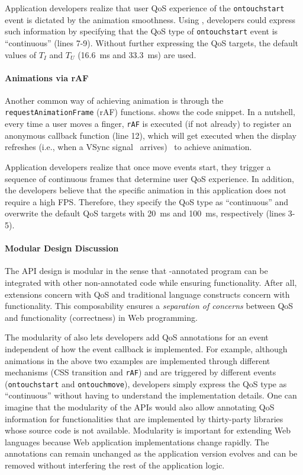 Application developers realize that user QoS experience of the \texttt{ontouchstart} event is dictated by the animation smoothness. Using \greenweb, developers could express such information by specifying that the QoS type of \texttt{ontouchstart} event is ``continuous'' (lines 7-9). Without further expressing the QoS targets, the default values of $T_I$ and $T_U$ (16.6~ms and 33.3~ms) are used.

\paragraph{Animations via rAF} Another common way of achieving animation is through the \texttt{requestAnimationFrame} (rAF) functions.  shows the code snippet. In a nutshell, every time a user moves a finger, \texttt{rAF} is executed (if not already) to register an anonymous callback function (line 12), which will get executed when the display refreshes (i.e., when a VSync signal~\cite{vsync} arrives)~\cite{jankbusting} to achieve animation.

Application developers realize that once move events start, they trigger a sequence of continuous frames that determine user QoS experience. In addition, the developers believe that the specific animation in this application does not require a high FPS. Therefore, they specify the QoS type as ``continuous'' and overwrite the default QoS targets with 20~ms and 100~ms, respectively (lines 3-5).

\paragraph{Modular Design Discussion} The \greenweb API design is modular in the sense that \greenweb-annotated program can be integrated with other non-annotated code while ensuring functionality. After all, \greenweb extensions concern with QoS and traditional language constructs concern with functionality. This composability ensures a \textit{separation of concerns} between QoS and functionality (correctness) in Web programming.

The modularity of \greenweb also lets developers add QoS annotations for an event independent of how the event callback is implemented. For example, although animations in the above two examples are implemented through different mechanisms (CSS transition and \texttt{rAF}) and are triggered by different events (\texttt{ontouchstart} and \texttt{ontouchmove}), developers simply express the QoS type as ``continuous'' without having to understand the implementation details. One can imagine that the modularity of the \greenweb APIs would also allow annotating QoS information for functionalities that are implemented by thirty-party libraries whose source code is not available. Modularity is important for extending Web languages because Web application implementations change rapidly. The \greenweb annotations can remain unchanged as the application version evolves and can be removed without interfering the rest of the application logic.

